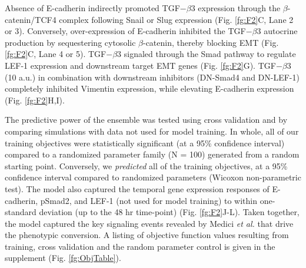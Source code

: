 \documentclass[12pt]{article}
\begin{document}
Absence of E-cadherin indirectly promoted TGF$-\beta$3 expression through the $\beta$-catenin/TCF4 complex following Snail or Slug expression (Fig. \ref{fg:F2}C, Lane 2 or 3).
Conversely, over-expression of E-cadherin inhibited the TGF$-\beta$3 autocrine production by sequestering cytosolic $\beta$-catenin, thereby blocking EMT (Fig. \ref{fg:F2}C, Lane 4 or 5).
TGF$-\beta$3 signaled through the Smad pathway to regulate LEF-1 expression and downstream target EMT genes (Fig. \ref{fg:F2}G).
TGF$-\beta$3 (10 a.u.) in combination with downstream inhibitors (DN-Smad4 and DN-LEF-1) completely inhibited Vimentin expression, while elevating E-cadherin expression (Fig. \ref{fg:F2}H,I).

The predictive power of the ensemble was tested using cross validation and by comparing simulations with data not used for model training.
In whole, all of our training objectives were statistically significant (at a 95\% confidence interval) compared to a randomized parameter family (N = 100)
generated from a random starting point. Conversely, we \emph{predicted} all of the training objectives, at a 95\% confidence interval compared to randomized parameters (Wicoxon non-parametric test). The model also captured the temporal gene expression responses of E-cadherin, pSmad2, and LEF-1 (not used for model training) to within one-standard deviation (up to the 48 hr time-point) (Fig. \ref{fg:F2}J-L). Taken together, the model captured the key signaling events revealed by Medici \emph{et al.} \citep{Medici:2008fk} that drive the phenotypic conversion.
A listing of objective function values resulting from training, cross validation and the random parameter control is given in the supplement (Fig. \ref{fg:ObjTable}).
\end{document}
